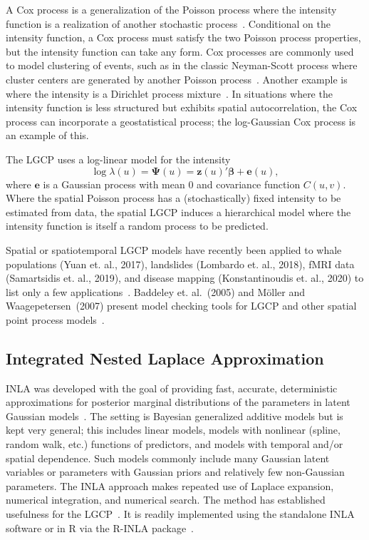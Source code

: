 \documentclass[]{interact}
\begin{document}
A Cox process is a generalization of the Poisson process where the intensity
function is a realization of another stochastic process~\cite{cox,digglepoint}.
Conditional on the intensity function, a Cox process must satisfy the two
Poisson process properties, but the intensity function can take any form. Cox
processes are commonly used to model clustering of events, such as in the
classic Neyman-Scott process where cluster centers are generated by another
Poisson process~\cite{neymanscott}. Another example is where the intensity is
a Dirichlet process mixture~\cite{taddy,flagg2020}. In situations where the intensity
function is less structured but exhibits spatial autocorrelation, the Cox
process can incorporate a geostatistical process; the log-Gaussian Cox process
is an example of this.

The LGCP uses a log-linear model for the intensity
\begin{equation}
\log\lambda(u) = \boldsymbol{\Psi}(u)
= \mathbf{z}(u)' \boldsymbol{\beta} + \mathbf{e}(u),
\end{equation}
where \(\mathbf{e}\) is a Gaussian process with mean 0 and covariance function
\(C(u, v)\). Where the spatial Poisson process has a (stochastically) 
fixed intensity to be
estimated from data, the spatial LGCP induces a hierarchical model where the
intensity function is itself a random process to be predicted.

Spatial or spatiotemporal LGCP models have recently been applied to whale
populations (Yuan et. al., 2017), landslides (Lombardo et. al., 2018), fMRI
data (Samartsidis et. al., 2019), and disease mapping (Konstantinoudis et.
al., 2020) to list only a few
applications~\cite{yuanetal,lombardoetal,samartsidisetal,konstantinoudisetal}.
Baddeley et. al.~(2005) and M\"{o}ller and Waagepetersen~(2007) present model
checking tools for LGCP and other spatial point process
models~\cite{baddeleyresiduals,moellerwaagepetersen}.


\subsection{Integrated Nested Laplace Approximation}
\label{inla}

INLA was developed with the goal of providing fast, accurate, deterministic
approximations for posterior marginal distributions of the parameters in
latent Gaussian models~\cite{rueetal}. The setting is Bayesian generalized
additive models but is kept very general; this includes linear models, models
with nonlinear (spline, random walk, etc.) functions of predictors, and models
with temporal and/or spatial dependence. Such models commonly include many
Gaussian latent variables or parameters with Gaussian priors and relatively
few non-Gaussian parameters. The INLA approach makes repeated use of Laplace
expansion, numerical integration, and numerical search. The method has
established usefulness for the LGCP~\cite{illianetal}. It is readily implemented
using the standalone INLA software or in R via the R-INLA
package~\cite{inlar}.
\end{document}
